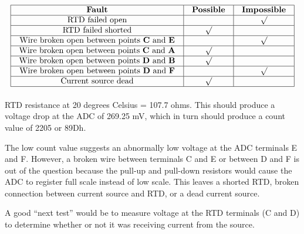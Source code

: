 $$\vbox{\offinterlineskip
\halign{\strut
\vrule \quad\hfil # \ \hfil & 
\vrule \quad\hfil # \ \hfil & 
\vrule \quad\hfil # \ \hfil \vrule \cr
\noalign{\hrule}
%
{\bf Fault} & {\bf Possible} & {\bf Impossible} \cr
%
\noalign{\hrule}
%
RTD failed open &  & $\surd$ \cr
%
\noalign{\hrule}
%
RTD failed shorted & $\surd$ &  \cr
%
\noalign{\hrule}
%
Wire broken open between points {\bf C} and {\bf E} &  & $\surd$ \cr
%
\noalign{\hrule}
%
Wire broken open between points {\bf C} and {\bf A} & $\surd$ &  \cr
%
\noalign{\hrule}
%
Wire broken open between points {\bf D} and {\bf B} & $\surd$ &  \cr
%
\noalign{\hrule}
%
Wire broken open between points {\bf D} and {\bf F} &  & $\surd$ \cr
%
\noalign{\hrule}
%
Current source dead & $\surd$ &  \cr
%
\noalign{\hrule}
} %
}$$ %


RTD resistance at 20 degrees Celsius = 107.7 ohms.  This should produce a voltage drop at the ADC of 269.25 mV, which in turn should produce a count value of 2205 or 89Dh.  

\vskip 10pt

The low count value suggests an abnormally low voltage at the ADC terminals E and F.  However, a broken wire between terminals C and E or between D and F is out of the question because the pull-up and pull-down resistors would cause the ADC to register full scale instead of low scale.  This leaves a shorted RTD, broken connection between current source and RTD, or a dead current source.

\vskip 10pt

A good ``next test'' would be to measure voltage at the RTD terminals (C and D) to determine whether or not it was receiving current from the source.





